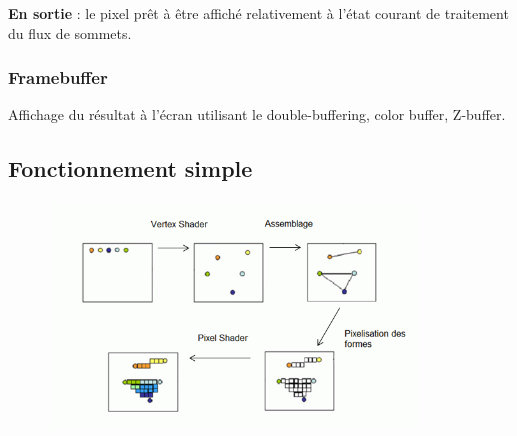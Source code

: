\textbf{En sortie} : le pixel prêt à être affiché relativement à l'état courant de traitement du flux de sommets.

\subsubsection{Framebuffer}
Affichage du résultat à l’écran utilisant le double-buffering, color buffer, Z-buffer.

\subsection{Fonctionnement simple}
\includegraphics[width=12cm,height=60mm]{leo/images/pipelineSimple.png}
